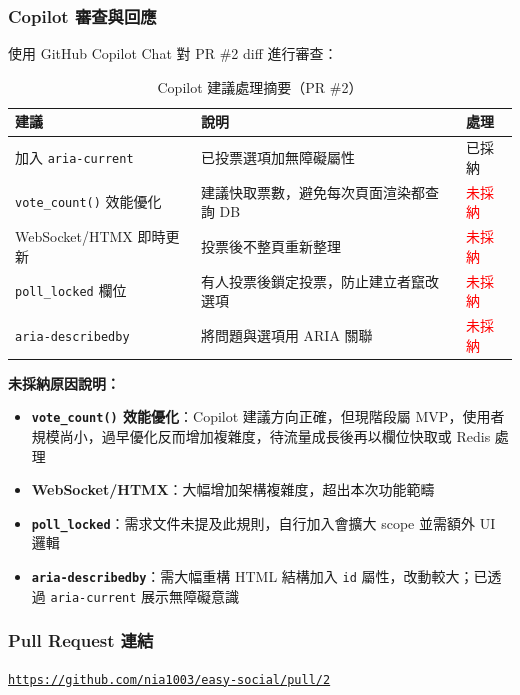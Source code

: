 \documentclass[12pt, a4paper]{article}
\begin{document}
\subsubsection*{Copilot 審查與回應}

使用 GitHub Copilot Chat 對 PR \#2 diff 進行審查：

\begin{table}[H]
\centering
\begin{tabularx}{\textwidth}{lXl}
\toprule
\textbf{建議} & \textbf{說明} & \textbf{處理} \\
\midrule
加入 \texttt{aria-current} & 已投票選項加無障礙屬性 & \textcolor{green!60!black}{已採納} \\
\midrule
\texttt{vote\_count()} 效能優化 & 建議快取票數，避免每次頁面渲染都查詢 DB & \textcolor{red}{未採納} \\
\midrule
WebSocket/HTMX 即時更新 & 投票後不整頁重新整理 & \textcolor{red}{未採納} \\
\midrule
\texttt{poll\_locked} 欄位 & 有人投票後鎖定投票，防止建立者竄改選項 & \textcolor{red}{未採納} \\
\midrule
\texttt{aria-describedby} & 將問題與選項用 ARIA 關聯 & \textcolor{red}{未採納} \\
\bottomrule
\end{tabularx}
\caption{Copilot 建議處理摘要（PR \#2）}
\end{table}

\textbf{未採納原因說明：}
\begin{itemize}[leftmargin=2em]
  \item \textbf{\texttt{vote\_count()} 效能優化}：Copilot 建議方向正確，但現階段屬 MVP，使用者規模尚小，過早優化反而增加複雜度，待流量成長後再以欄位快取或 Redis 處理
  \item \textbf{WebSocket/HTMX}：大幅增加架構複雜度，超出本次功能範疇
  \item \textbf{\texttt{poll\_locked}}：需求文件未提及此規則，自行加入會擴大 scope 並需額外 UI 邏輯
  \item \textbf{\texttt{aria-describedby}}：需大幅重構 HTML 結構加入 \texttt{id} 屬性，改動較大；已透過 \texttt{aria-current} 展示無障礙意識
\end{itemize}

\subsubsection*{Pull Request 連結}

\begin{tcolorbox}[colback=lightgreen, colframe=green!60!black, title=PR \#2 連結（已合併）]
\href{https://github.com/nia1003/easy-social/pull/2}{\texttt{https://github.com/nia1003/easy-social/pull/2}}
\end{tcolorbox}
\end{document}

